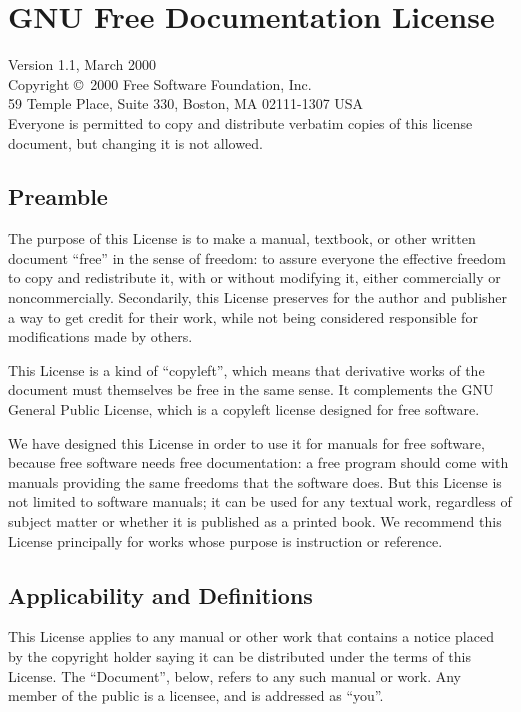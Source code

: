 
\chapter{GNU Free Documentation License}

Version 1.1, March 2000\\

 Copyright \copyright\ 2000  Free Software Foundation, Inc.\\
     59 Temple Place, Suite 330, Boston, MA  02111-1307  USA\\
 Everyone is permitted to copy and distribute verbatim copies
 of this license document, but changing it is not allowed.

\section*{Preamble}

The purpose of this License is to make a manual, textbook, or other
written document ``free'' in the sense of freedom: to assure everyone
the effective freedom to copy and redistribute it, with or without
modifying it, either commercially or noncommercially.  Secondarily,
this License preserves for the author and publisher a way to get
credit for their work, while not being considered responsible for
modifications made by others.

This License is a kind of ``copyleft'', which means that derivative
works of the document must themselves be free in the same sense.  It
complements the GNU General Public License, which is a copyleft
license designed for free software.

We have designed this License in order to use it for manuals for free
software, because free software needs free documentation: a free
program should come with manuals providing the same freedoms that the
software does.  But this License is not limited to software manuals;
it can be used for any textual work, regardless of subject matter or
whether it is published as a printed book.  We recommend this License
principally for works whose purpose is instruction or reference.

\section{Applicability and Definitions}

This License applies to any manual or other work that contains a
notice placed by the copyright holder saying it can be distributed
under the terms of this License.  The ``Document'', below, refers to any
such manual or work.  Any member of the public is a licensee, and is
addressed as ``you''.

